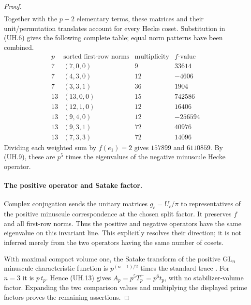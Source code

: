 \begin{proof}
\begin{gather*}
 \tag{UH.12}
\end{gather*}
Together with the $p+2$ elementary terms, these matrices and their
unit/permutation translates account for every Hecke coset.  Substitution
in (UH.6) gives the following complete table; equal norm patterns have
been combined.
\[
\begin{array}{c|c|r|r}
 p&\text{sorted first-row norms}&\text{multiplicity}&f\text{-value}\\\hline
 7&(7,0,0)&9&33614\\
 7&(4,3,0)&12&-4606\\
 7&(3,3,1)&36&1904\\\hline
 13&(13,0,0)&15&742586\\
 13&(12,1,0)&12&16406\\
 13&(9,4,0)&12&-256594\\
 13&(9,3,1)&72&40976\\
 13&(7,3,3)&72&14096
\end{array}
 \tag{UH.13}
\]
Dividing each weighted sum by $f(e_1)=2$ gives $157899$ and
$6110859$.  By (UH.9), these are $p^5$ times the eigenvalues of the
negative minuscule Hecke operator.

\paragraph{The positive operator and Satake factor.}
Complex conjugation sends the unitary matrices $g_\ell=U_\ell/\pi$
to representatives of the positive minuscule correspondence at the
chosen split factor.
It preserves $f$ and all first-row norms.
Thus the positive and negative operators have the same eigenvalue
on this invariant line.  This explicitly resolves their direction;
it is not inferred merely from the two operators having the same
number of cosets.

With maximal compact volume one, the Satake transform of the positive
$\mathrm{GL}_n$ minuscule characteristic function is
$p^{(n-1)/2}$ times the standard trace
\cite[\S3, (3.13)--(3.14), author preprint p.~8]{K17GrossSatake1998}.
For $n=3$ it is $p\,t_p$.  Hence (UH.13) gives
$A_p=p^5T_p^+=p^6t_p$, with no stabilizer-volume factor.  Expanding
the two comparison values and multiplying the displayed prime factors
proves the remaining assertions.
\end{proof}

